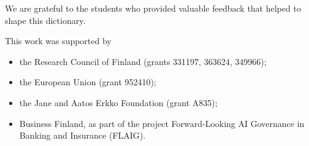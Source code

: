 \documentclass[journal,12pt,onecolumn]{article}
\newif\iffastdraft
\begin{document}
\noindent We are grateful to the students who provided valuable feedback that helped 
to shape this dictionary. %

\noindent This work was supported by
\begin{itemize} 
	\item the Research Council of Finland (grants 331197, 363624, 349966);
	\item the European Union (grant 952410);
	\item the Jane and Aatos Erkko Foundation (grant A835); 
	\item Business Finland, as part of the project Forward-Looking AI Governance in Banking and Insurance (FLAIG).
\end{itemize} 



\newpage
\tableofcontents



\newpage

\glsaddallunused


\printglossary[type=math,title={Mathematical Tools}, nonumberlist]

\newpage
\printglossary[title={Machine Learning Concepts}, nonumberlist]


\newpage
\printglossary[type=reinflearning, title={Reinforcement Learning}, nonumberlist]

\newpage
\printglossary[type=mlsystems, title={Machine Learning Systems}, nonumberlist]

\newpage
\printglossary[type=regulation, title={Machine Learning Regulation}, nonumberlist]

\newpage
\printglossary[type=healthcare, title={Health Care}, nonumberlist]

\iffastdraft
\else
\newpage
\cleardoublepage
{}
\printindex
\fi


\newpage
\cleardoublepage
{}
{}


\end{document}
